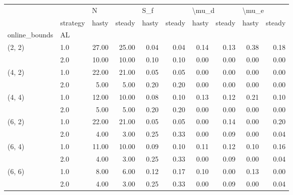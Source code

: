 \begin{tabular}{llrrrrrrrr}
\toprule
       & {} & \multicolumn{2}{l}{N} & \multicolumn{2}{l}{S\_f} & \multicolumn{2}{l}{\textbackslash mu\_d} & \multicolumn{2}{l}{\textbackslash mu\_e} \\
       & strategy & hasty & steady & hasty & steady & hasty & steady & hasty & steady \\
online\_bounds & AL &       &        &       &        &       &        &       &        \\
\midrule
(2, 2) & 1.0 & 27.00 &  25.00 &  0.04 &   0.04 &  0.14 &   0.13 &  0.38 &   0.18 \\
       & 2.0 & 10.00 &  10.00 &  0.10 &   0.10 &  0.00 &   0.00 &  0.00 &   0.00 \\
(4, 2) & 1.0 & 22.00 &  21.00 &  0.05 &   0.05 &  0.00 &   0.00 &  0.00 &   0.00 \\
       & 2.0 &  5.00 &   5.00 &  0.20 &   0.20 &  0.00 &   0.00 &  0.00 &   0.00 \\
(4, 4) & 1.0 & 12.00 &  10.00 &  0.08 &   0.10 &  0.13 &   0.12 &  0.21 &   0.10 \\
       & 2.0 &  5.00 &   5.00 &  0.20 &   0.20 &  0.00 &   0.00 &  0.00 &   0.00 \\
(6, 2) & 1.0 & 22.00 &  21.00 &  0.05 &   0.05 &  0.00 &   0.14 &  0.00 &   0.20 \\
       & 2.0 &  4.00 &   3.00 &  0.25 &   0.33 &  0.00 &   0.09 &  0.00 &   0.04 \\
(6, 4) & 1.0 & 11.00 &  10.00 &  0.09 &   0.10 &  0.11 &   0.12 &  0.10 &   0.16 \\
       & 2.0 &  4.00 &   3.00 &  0.25 &   0.33 &  0.00 &   0.09 &  0.00 &   0.04 \\
(6, 6) & 1.0 &  8.00 &   6.00 &  0.12 &   0.17 &  0.10 &   0.00 &  0.13 &   0.00 \\
       & 2.0 &  4.00 &   3.00 &  0.25 &   0.33 &  0.00 &   0.09 &  0.00 &   0.04 \\
\bottomrule
\end{tabular}
